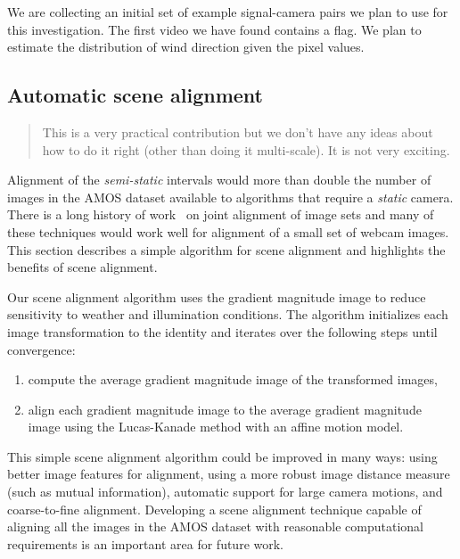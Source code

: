 We are collecting an initial set of example signal-camera pairs we
plan to use for this investigation.  The first video we have found
contains a flag.  We plan to estimate the distribution of wind
direction given the pixel values.

%
%
%
\subsection{Automatic scene alignment}
\label{sec:sceneAlignment}

\begin{quote}
  This is a very practical contribution but we don't have any ideas
  about how to do it right (other than doing it multi-scale).  It is
  not very exciting.
\end{quote}

Alignment of the {\it semi-static} intervals would more than double the
number of images in the AMOS dataset available to algorithms that
require a {\it static} camera.  There is a long history of
work~\cite{szeliski2006alignment} on joint alignment of image sets and
many of these techniques would work well for alignment of a small set
of webcam images. This section describes a simple algorithm for scene
alignment and highlights the benefits of scene alignment.

Our scene alignment algorithm uses the gradient magnitude image to
reduce sensitivity to weather and illumination conditions.  The
algorithm initializes each image transformation to the identity and
iterates over the following steps until convergence:
    \vspace{-.1in}
\begin{enumerate}
  \item compute the average gradient magnitude image of the
    transformed images,
    \vspace{-.1in}
  \item align each gradient magnitude image to the average gradient
    magnitude image using the Lucas-Kanade method with an affine
    motion model. 
\end{enumerate}
    \vspace{-.1in}
This simple scene alignment algorithm could be improved in many ways:
using better image features for alignment, using a more robust image
distance measure (such as mutual information), automatic support for
large camera motions, and coarse-to-fine alignment.  Developing a
scene alignment technique capable of aligning all the images in the
AMOS dataset with reasonable computational requirements is an
important area for future work.  

